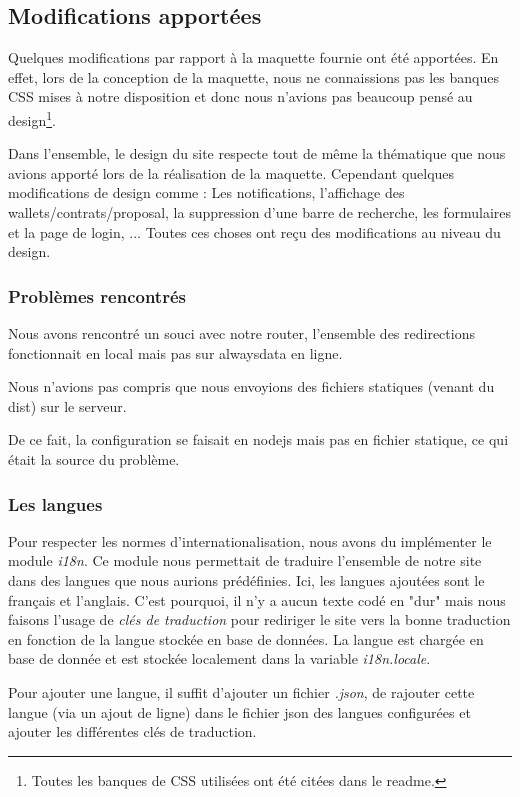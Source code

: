\newpage
\subsection{Modifications apportées}
\begin{flushleft}
    Quelques modifications par rapport à la maquette fournie ont été apportées. En effet, lors de la conception de la maquette, nous ne connaissions pas les banques CSS mises à notre disposition et donc nous n'avions pas beaucoup pensé au design\footnote{Toutes les banques de CSS utilisées ont été citées dans le readme.}.
\end{flushleft}
\begin{flushleft}
    Dans l'ensemble, le design du site respecte tout de même la thématique que nous avions apporté lors de la réalisation de la maquette. Cependant quelques modifications de design comme : Les notifications, l'affichage des wallets/contrats/proposal, la suppression d'une barre de recherche, les formulaires et la page de login, ... Toutes ces choses ont reçu des modifications au niveau du design.
\end{flushleft} 

\subsubsection{Problèmes rencontrés}
\begin{flushleft}
Nous avons rencontré un souci avec notre router, l’ensemble des redirections fonctionnait en local mais pas sur alwaysdata en ligne.
\end{flushleft}
\begin{flushleft}
Nous n’avions pas compris que nous envoyions des fichiers statiques (venant du dist) sur le serveur.
\end{flushleft}
\begin{flushleft}
De ce fait, la configuration se faisait en nodejs mais pas en fichier statique, ce qui était la source du problème.
\end{flushleft}

\newpage
\subsubsection{Les langues}
\begin{flushleft}
    Pour respecter les normes d'internationalisation, nous avons du implémenter le module \textit{i18n}. Ce module nous permettait de traduire l'ensemble de notre site dans des langues que nous aurions prédéfinies. Ici, les langues ajoutées sont le français et l'anglais. C'est pourquoi, il n'y a aucun texte codé en "dur" mais nous faisons l'usage de \textit{clés de traduction} pour rediriger le site vers la bonne traduction en fonction de la langue stockée en base de données. La langue est chargée en base de donnée et est stockée localement dans la variable \textit{i18n.locale}.
\end{flushleft}
\begin{flushleft}
    Pour ajouter une langue, il suffit d'ajouter un fichier \textit{.json}, de rajouter cette langue (via un ajout de ligne) dans le fichier json des langues configurées et ajouter les différentes clés de traduction.
\end{flushleft}

